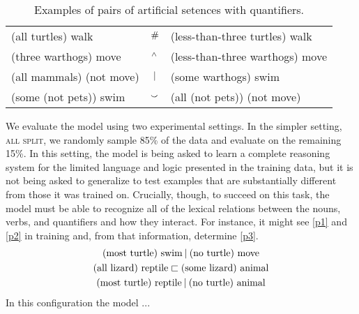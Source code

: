 
\begin{table*}[htp]
  \centering
  \begin{tabular}{lcl}
    \toprule
    (all turtles) walk      &    $\mathbin{\#}$  & (less-than-three turtles) walk\\
    (three warthogs) move  &        $\mathbin{^{\wedge}}$ & (less-than-three warthogs) move\\
    (all mammals) (not move) &         $\mathbin{|}$ & (some warthogs) swim\\
    (some (not pets)) swim     &     $\mathbin{\smallsmile}$  & (all (not pets)) (not move)\\
    \bottomrule
  \end{tabular}
  \caption{\label{examplesofdata}Examples of pairs of artificial setences with quantifiers.}

\end{table*}

We evaluate the model using two experimental settings. In the simpler
setting, \textsc{all split}, we randomly sample 85\% of the data and evaluate on the
remaining 15\%. In this setting, the model is being asked to learn a
complete reasoning system for the limited language and logic presented
in the training data, but it is not being asked to generalize to test
examples that are substantially different from those it was trained
on. Crucially, though, to succeed on this task, the model must be able
to recognize all of the lexical relations between the nouns, verbs,
and quantifiers and how they interact. For instance, it might see
\eqref{p1} and \eqref{p2} in training and, from that information,
determine \eqref{p3}.
%
%
\begin{gather}
  \text{(most turtle) swim} \mathbin{|} \text{(no turtle) move}\label{p1}
  \\
  \text{(all lizard) reptile} \sqsubset  \text{(some lizard) animal}\label{p2}
  \\
  \text{(most turtle) reptile} \mathbin{|} \text{(no turtle) animal}\label{p3}
\end{gather}
%
%
In this configuration the model ...


